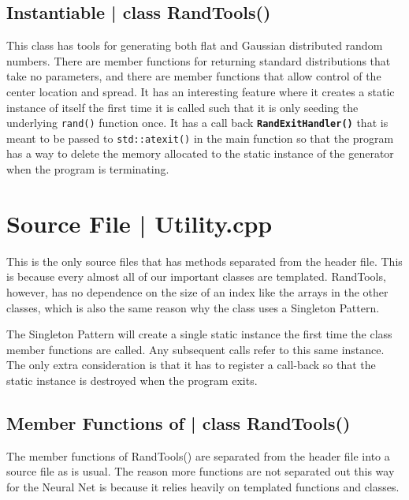 \documentclass[a4paper,10pt]{article}
\newcommand{\code}[1]{ {\fontfamily{lmtt}\fontseries{b}\selectfont
	#1}
}
\begin{document}
\subsection{Instantiable |\code{class RandTools()}}

This class has tools for generating both flat and Gaussian distributed random numbers.  There are member functions for
returning standard distributions that take no parameters, and there are member functions that allow control of the
center location and spread.
It has an interesting feature where it creates a static instance of itself the first time it is called such that it is
only seeding the underlying \texttt{rand()} function once.  It has a call back \texttt{\textbf{RandExitHandler()}} that
is meant to be passed to \texttt{std::atexit()} in the main function so that the program has a way to delete the memory
allocated to the static instance of the generator when the program is terminating.

                                                     
\section{Source File |\code{Utility.cpp}}

This is the only source files that has methods separated from the header file.  This is because every almost all of our
important classes are templated.  RandTools, however, has no dependence on the size of an index like the arrays
in the other classes, which is also the same reason why the class uses a Singleton Pattern.

The Singleton Pattern will create a single static instance the first time the class member functions are called. Any
subsequent calls refer to this same instance. The only extra consideration is that it has to register a call-back so
that the static instance is destroyed when the program exits.


\subsection{Member Functions of |\code{class RandTools()}}     


The member functions of \code{RandTools()} are separated from the header file into a source file as is usual. The reason
more functions are not separated out this way for the Neural Net is because it relies heavily on templated functions and
classes.
\end{document}

